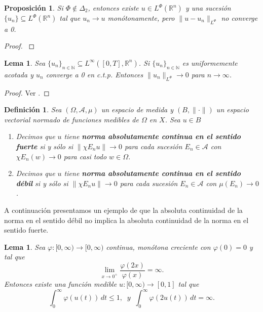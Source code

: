 \documentclass[a4paper,11pt]{amsart}
\theoremstyle{plain}
\newtheorem{lem}[thm]{Lema}
\newtheorem{prop}[thm]{Proposici\'on}
\newtheorem{defi}[thm]{Definici\'on}
\theoremstyle{remark}
\theoremstyle{remark}
\newcommand{\rr}{\mathbb{R}}
\newcommand{\nn}{\mathbb{N}}
\numberwithin{equation}{section}
\begin{document}
\begin{prop}
Si $\Phi \notin \Delta_2$, entonces existe $u \in L^{\Phi}(\rr^n)$ y una sucesi\'on $\{u_n\}\subseteq L^{\Phi}(\rr^n)$ tal que $u_n \to u$ mon\'otonamente, pero $\| u-u_n\|_{L^{\Phi}}$ no converge a 0. 
\end{prop}

\begin{proof}
\cite{Schap2005}
\end{proof}


\begin{lem}
Sea $\{u_n\}_{n\in \nn}\subseteq L^{\infty}([0,T],\rr^n)$. Si $\{ u_n\}_{n \in \nn}$ es uniformemente acotada y $u_n$ converge a 0 en c.t.p. Entonces $\|u_n \|_{L^{\Phi}} \to 0$ para $n \to \infty$. 
\end{lem}

\begin{proof}
Ver \cite{DG2001}.
\end{proof}


\begin{defi}
Sea $(\Omega,\mathcal{A},\mu)$ un espacio de medida y $(B,\|\cdot\|)$ un espacio vectorial normado de funciones medibles de $\Omega$ en $X$.
Sea $u \in B$
\begin{enumerate}
\item Decimos que $u$ tiene {\bf norma absolutamente continua en el sentido fuerte} si y s\'olo si $\|\chi E_n u\|\to 0$ para cada  sucesi\'on $E_n \in \mathcal{A}$ con $\chi E_n (w)\to 0$ para casi todo $w \in \Omega$.
\item Decimos que $u$ tiene {\bf norma absolutamente continua en el sentido d\'ebil} si y s\'olo si $\|\chi E_n u\|\to 0$ para cada sucesi\'on $E_n \in \mathcal{A}$ con $\mu (E_n)\to 0$.
\end{enumerate}
\end{defi}

A continuaci\'on presentamos un ejemplo de que la absoluta continuidad de la norma en el sentido d\'ebil no implica la absoluta continuidad de la norma en el sentido fuerte.

\begin{lem}
Sea $\varphi:[0,\infty) \to [0,\infty)$ continua, mon\'otona creciente con $\varphi(0)=0$ y tal que 
\[
\lim\limits_{x \to 0^+} \frac{\varphi(2x)}{\varphi(x)}=\infty.
\]
Entonces existe una funci\'on  medible $u:[0,\infty) \to [0,1]$ tal que
\[
\int_0^{\infty} \varphi(u(t))\,dt \leq 1, \;\;y\;\;\int_0^{\infty} \varphi(2u(t))\,dt=\infty.
\]
\end{lem}
\end{document}
